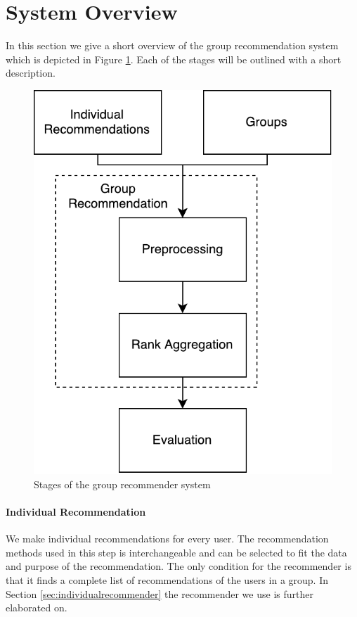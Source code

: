 \section{System Overview}\label{sec:systemoverview}
In this section we give a short overview of the group recommendation system which is depicted in Figure \ref{fig:composition}. Each of the stages will be outlined with a short description. 
\begin{figure}[H]
\centering
\includegraphics[scale=.4]{graphics/composition}
\caption{Stages of the group recommender system}\label{fig:composition}
\end{figure}
\paragraph{Individual Recommendation} We make individual recommendations for every user. The recommendation methods used in this step is interchangeable and can be selected to fit the data and purpose of the recommendation. The only condition for the recommender is that it finds a complete list of recommendations of the users in a group. In Section \ref{sec:individualrecommender} the recommender we use is further elaborated on.

